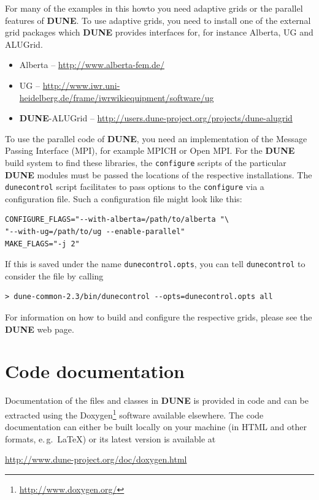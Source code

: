 \documentclass[11pt,a4paper,headinclude,footinclude,DIV16,headings=normal]{scrreprt}
\newcommand{\Dune}{{\sffamily\bfseries DUNE}\xspace}
\begin{document}
For many of the examples in this howto you need adaptive grids or the
parallel features of \Dune{}.  To use adaptive grids, you need to
install one of the external grid packages which \Dune{} provides
interfaces for, for instance Alberta, UG and ALUGrid.
\begin{itemize}
\item Alberta -- \url{http://www.alberta-fem.de/}
\item UG -- \url{http://www.iwr.uni-heidelberg.de/frame/iwrwikiequipment/software/ug}
\item \Dune{}-ALUGrid -- \url{http://users.dune-project.org/projects/dune-alugrid}
\end{itemize}
To use the parallel code of \Dune{}, you need an implementation of the
Message Passing Interface (MPI), for example MPICH or Open MPI.  For the
\Dune{} build system to find these libraries, the \texttt{configure}
scripts of the particular \Dune{} modules must be passed the locations
of the respective installations.  The \texttt{dunecontrol} script
facilitates to pass options to the \texttt{configure} via a
configuration file.  Such a configuration file might look like this:
\begin{lstlisting}
CONFIGURE_FLAGS="--with-alberta=/path/to/alberta "\
"--with-ug=/path/to/ug --enable-parallel"
MAKE_FLAGS="-j 2"
\end{lstlisting}
If this is saved under the name \texttt{dunecontrol.opts}, you
can tell \texttt{dunecontrol} to consider the file by calling
\begin{lstlisting}
> dune-common-2.3/bin/dunecontrol --opts=dunecontrol.opts all
\end{lstlisting}

For information on how to build and configure the respective grids,
please see the \Dune{} web page.

\section{Code documentation}

Documentation of the files and classes in \Dune{} is provided in code and
can be extracted using the
Doxygen\footnote{\url{http://www.doxygen.org/}}
software available elsewhere. The code documentation can either be built
locally on your machine (in HTML and other formats, e.\,g.~\LaTeX)
or its latest version is available at
\begin{center}
\url{http://www.dune-project.org/doc/doxygen.html}
\end{center}
\end{document}
